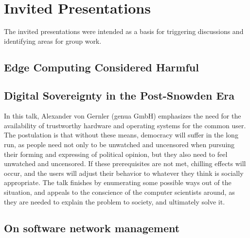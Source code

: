 \section{Invited Presentations}\label{sec:invited-presentations}

The invited presentations were intended as a basis for triggering discussions
and identifying areas for group work.

\subsection{Edge Computing Considered Harmful}


\subsection{Digital Sovereignty in the Post-Snowden Era}

In this talk, Alexander von Gernler (genua GmbH) emphasizes the need for the
availability of trustworthy hardware and operating systems for the common
user.  The postulation is that without these means, democracy will suffer in
the long run, as people need not only to be unwatched and uncensored when
pursuing their forming and expressing of political opinion, but they also need
to feel unwatched and uncensored.  If these prerequisites are not met,
chilling effects will occur, and the users will adjust their behavior to
whatever they think is socially appropriate.  The talk finishes by enumerating
some possible ways out of the situation, and appeals to the conscience of the
computer scientists around, as they are needed to explain the problem to
society, and ultimately solve it.

\subsection{On software network management}

